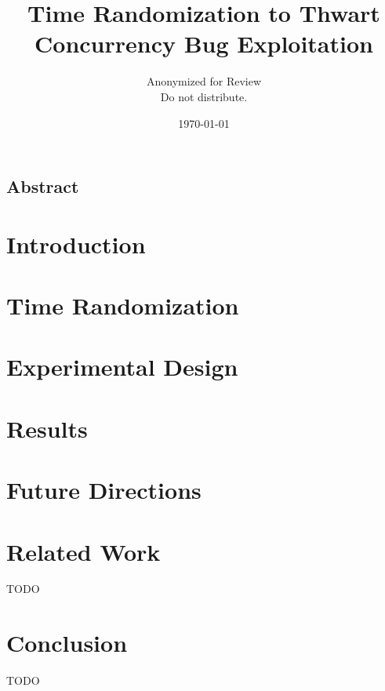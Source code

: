 \documentclass[letterpaper,twocolumn,10pt]{article}
\begin{document}
\date{\today}

\title{\Large \bf Time Randomization to Thwart Concurrency Bug Exploitation}

\author{
{\rm Anonymized for Review}\\
Do not distribute.
} %

\maketitle

\subsection*{Abstract}


\section{Introduction}


\section{Time Randomization}


\section{Experimental Design}


\section{Results}


\section{Future Directions}


\section{Related Work}
TODO

\section{Conclusion}
TODO

{\footnotesize 
}
\end{document}
